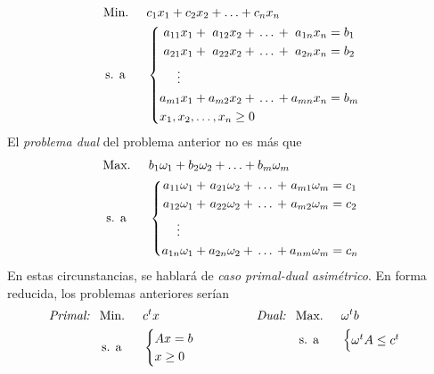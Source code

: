 \documentclass[11pt]{report}
\theoremstyle{mytheorem}
\theoremstyle{mydefinition}
\theoremstyle{myexample}
\begin{document}
\[\begin{aligned}[t]
&\text{Min. } &&c_1x_1+c_2x_2+\mathellipsis+c_nx_n \\
& \, \text{s. a} && \left\{\begin{alignedat}{10}
& & a_{11}&x_1 & {}+{} & & a_{12}&x_2 {}+{} \mathellipsis {}+{} & a_{1n}&x_n {}={} b_1 \\
& & a_{21}&x_1 & {}+{} & & a_{22}&x_2 {}+{} \mathellipsis {}+{} & a_{2n}&x_n {}={} b_2 \\
& & \vdots \\
& & a_{m1}&x_1 & {}+{} & & a_{m2}&x_2 {}+{} \mathellipsis {}+{} & a_{mn}&x_n {}={} b_m \\
& \mathrlap{x_1, x_2,\mathellipsis,x_n \geq 0} \\
\end{alignedat}\right.
\end{aligned}\]
El {\textit{problema dual}} del problema anterior no es más que
\[\begin{aligned}[t]
&\text{Max. } &&b_1\omega_1+b_2\omega_2+\mathellipsis+b_m\omega_m \\
& \; \text{s. a} &&\left\{\begin{alignedat}{10}
& & a_{11}&\omega_1 & {}+{} & & a_{21}&\omega_2 {}+{} \mathellipsis {}+{} & a_{m1}&\omega_m {}={} c_1 \\
& & a_{12}&\omega_1 & {}+{} & & a_{22}&\omega_2 {}+{} \mathellipsis {}+{} & a_{m2}&\omega_m {}={} c_2 \\
& & \vdots \\
& & a_{1n}&\omega_1 & {}+{} & & a_{2n}&\omega_2 {}+{} \mathellipsis {}+{} & a_{nm}&\omega_m {}={} c_n
\end{alignedat}\right.
\end{aligned}\]
En estas circunstancias, se hablará de {\textit{caso primal-dual asimétrico}}. En forma reducida, los problemas anteriores serían
\[\begin{aligned}[t]
\textit{\textit{Primal: }} \ &\text{Min. } && c^tx \\
& \, \text{s. a} &&\begin{cases}
    Ax=b \\
    x \geq 0 \\
\end{cases}
\end{aligned} \qquad \qquad \begin{aligned}[t]
\textit{\textit{Dual: }} \ &\text{Max. } && \omega^t b \\
& \; \text{s. a} &&\begin{cases}
    \omega^t A \leq c^t
\end{cases}
\end{aligned}\]
\end{document}
